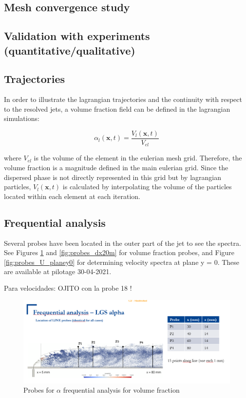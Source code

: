 \subsection{Mesh convergence study}

\subsection{Validation with experiments (quantitative/qualitative)}

\subsection{Trajectories}

In order to illustrate the lagrangian trajectories and the continuity with respect to the resolved jets, a volume fraction field can be defined in the lagrangian simulations:

\begin{equation}
\alpha_l \left( \textbf{x}, t \right) = \frac{V_l \left( \textbf{x}, t \right)}{V_{el}}
\end{equation}

where $V_{el}$ is the volume of the element in the eulerian mesh grid. Therefore, the volume fraction is a magnitude defined in the main eulerian grid. Since the dispersed phase is not directly represented in this grid but by lagrangian particles, $V_l \left( \textbf{x}, t \right)$ is calculated by interpolating the volume of the particles located within each element at each iteration.

\subsection{Frequential analysis}

Several probes have been located in the outer part of the jet to see the spectra. See Figures \ref{fig:probes_dx10m} and \ref{fig:probes_dx20m} for volume fraction probes, and Figure \ref{fig:probes_U_planey0} for determining velocity spectra at plane y = 0. These are available at pilotage 30-04-2021.

Para velocidades: OJITO con la probe 18 !

\begin{figure}[h!]
	\centering
	\includegraphics[scale=0.7]{./part2_developments/figures_ch6_lagrangian_JICF/probes_vol_frac}
	\caption{Probes for $\alpha$ frequential analysis for volume fraction}
	\label{fig:probes_dx10m}
\end{figure}


